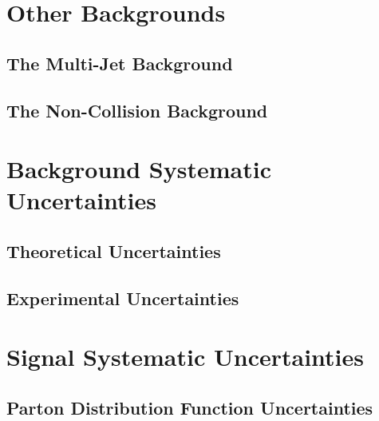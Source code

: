 \documentclass[10pt,twoside,cucitura,classica,english,openany]{toptesi}
\begin{document}


\section{Other Backgrounds}
\label{sec:other-backgrounds}

\subsection{The Multi-Jet Background}
\label{sec:multi-jet-background}



\subsection{The Non-Collision Background}
\label{sec:non-coll-backgr}



\section{Background Systematic Uncertainties}
\label{sec:syst-uncert}



\subsection{Theoretical Uncertainties}
\label{sec:theor-uncert}



\subsection{Experimental Uncertainties}
\label{sec:exper-uncert}



\section{Signal Systematic Uncertainties}
\label{sec:sign-syst-uncert}



\subsection{Parton Distribution Function Uncertainties}
\label{sec:part-distr-funct}
\end{document}
